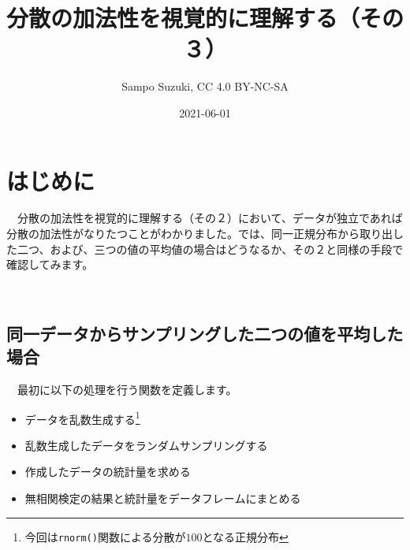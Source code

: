 \documentclass[]{tufte-handout}
\title[分散の加法性を視覚的に理解する（その３）]{分散の加法性を視覚的に理解する（その３）}
\author{Sampo Suzuki, CC 4.0 BY-NC-SA}
\date{2021-06-01}
\providecommand{\tightlist}{%
  \setlength{\itemsep}{0pt}\setlength{\parskip}{0pt}}
\begin{document}
\maketitle




\hypertarget{ux306fux3058ux3081ux306b}{%
\section{\texorpdfstring{\textbf{はじめに}}{はじめに}}\label{ux306fux3058ux3081ux306b}}

　分散の加法性を視覚的に理解する（その２）において、データが独立であれば分散の加法性がなりたつことがわかりました。では、同一正規分布から取り出した二つ、および、三つの値の平均値の場合はどうなるか、その２と同様の手段で確認してみます。

　

\hypertarget{ux540cux4e00ux30c7ux30fcux30bfux304bux3089ux30b5ux30f3ux30d7ux30eaux30f3ux30b0ux3057ux305fux4e8cux3064ux306eux5024ux3092ux5e73ux5747ux3057ux305fux5834ux5408}{%
\subsection{\texorpdfstring{\textbf{同一データからサンプリングした二つの値を平均した場合}}{同一データからサンプリングした二つの値を平均した場合}}\label{ux540cux4e00ux30c7ux30fcux30bfux304bux3089ux30b5ux30f3ux30d7ux30eaux30f3ux30b0ux3057ux305fux4e8cux3064ux306eux5024ux3092ux5e73ux5747ux3057ux305fux5834ux5408}}

　最初に以下の処理を行う関数を定義します。

\begin{itemize}
\tightlist
\item
  データを乱数生成する\footnote{今回は\texttt{rnorm()}関数による分散が\(100\)となる正規分布}
\item
  乱数生成したデータをランダムサンプリングする
\item
  作成したデータの統計量を求める
\item
  無相関検定の結果と統計量をデータフレームにまとめる
\end{itemize}
\end{document}
